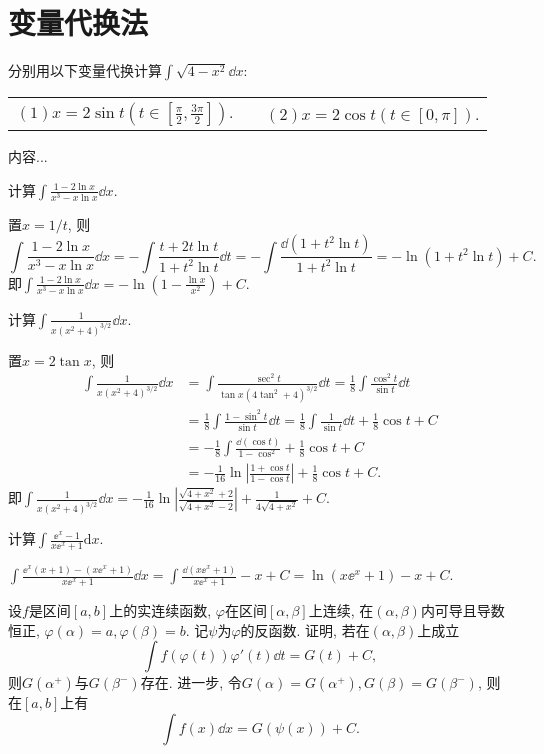 \section{变量代换法}
\begin{quiza}
\woe 分别用以下变量代换计算\(\int \sqrt{4-x^2}\dd x\):
\vspace{8pt}\\
\begin{tabular}{lcl}
\((1)x=2\sin t\left(t\in\left[\frac{\pi}{2},\frac{3\pi}{2}\right]\right)\).&\qquad\qquad\qquad&\((2)x=2\cos t\left(t\in[0,\pi]\right)\).
\end{tabular}
\begin{solution}
内容...
\end{solution}
\woe 计算\(\int\frac{1-2\ln x}{x^3-x\ln x}\dd x\).
\begin{solution}
置\(x=1/t\), 则\[\int\frac{1-2\ln x}{x^3-x\ln x}\dd x=-\int\frac{t+2t\ln t}{1+t^2\ln t}\dd t=-\int\frac{\dd\left(1+t^2\ln t\right)}{1+t^2\ln t}=-\ln\left(1+t^2\ln t\right)+C.\]即\(\int\frac{1-2\ln x}{x^3-x\ln x}\dd x=-\ln\left(1-\frac{\ln x}{x^2}\right)+C\).
\end{solution}
\woe 计算\(\int\frac{1}{x(x^2+4)^{3/2}}\dd x\).
\begin{solution}
置\(x=2\tan x\), 则
\[\begin{split}
\int\frac{1}{x(x^2+4)^{3/2}}\dd x&=\int\frac{\sec^2t}{\tan x\left(4\tan^2+4\right)^{3/2}}\dd t=\frac{1}{8}\int\frac{\cos^2t}{\sin t}\dd t\\&=\frac{1}{8}\int\frac{1-\sin ^2t}{\sin t}\dd t=\frac{1}{8}\int\frac{1}{\sin t}\dd t+\frac{1}{8}\cos t+C\\
&=-\frac{1}{8}\int\frac{\dd (\cos t)}{1-\cos ^2}+\frac{1}{8}\cos t+C\\
&=-\frac{1}{16}\ln\left|\frac{1+\cos t}{1-\cos t}\right|+\frac{1}{8}\cos t+C.
\end{split}\]即\(\int\frac{1}{x(x^2+4)^{3/2}}\dd x=-\frac{1}{16}\ln\left|\frac{\sqrt{4+x^2}+2}{\sqrt{4+x^2}-2}\right|+\frac{1}{4\sqrt{4+x^2}}+C.\)
\end{solution}
\woe 计算\(\int\frac{\ee^x-1}{x\ee^x+1}\mathrm{d}x\).
\begin{solution}
\(\int\frac{\ee^x(x+1)-(x\ee^x+1)}{x\ee^x+1}\dd x=\int\frac{\dd(x\ee^x+1)}{x\ee^x+1}-x+C=\ln(x\ee^x+1)-x+C.\)
\end{solution}
\woe 设\(f\)是区间\([a,b]\)上的实连续函数, \(\varphi\)在区间\([\alpha,\beta]\)上连续, 在\((\alpha,\beta)\)内可导且导数恒正, \(\varphi(\alpha)=a,\varphi(\beta)=b.\) 记\(\psi\)为\(\varphi\)的反函数. 证明, 若在\((\alpha,\beta)\)上成立\[\int f\left(\varphi(t)\right)\varphi'(t)\dd t=G(t)+C,\]则\(G(\alpha^+)\)与\(G(\beta^-)\)存在. 进一步, 令\(G(\alpha)=G(\alpha^+),G(\beta)=G(\beta^-)\), 则在\([a,b]\)上有\[\int f(x)\dd x=G(\psi(x))+C.\]
\end{quiza}

